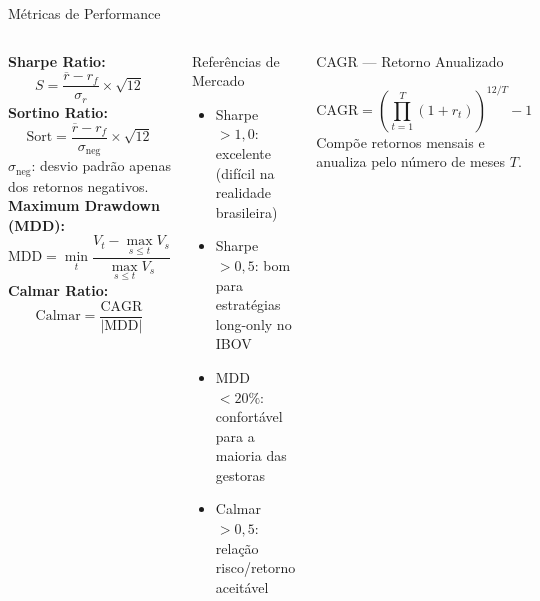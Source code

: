 \documentclass[aspectratio=169,12pt]{beamer}
\begin{document}
\begin{frame}[fragile]{Métricas de Performance}
\begin{columns}[T]
\textbf{Sharpe Ratio:}
\[ S = \frac{\overline{r} - r_f}{\sigma_r} \times \sqrt{12} \]
\vspace{.1em}
\textbf{Sortino Ratio:}
\[ \text{Sort} = \frac{\overline{r} - r_f}{\sigma_{\text{neg}}} \times \sqrt{12} \]
$\sigma_{\text{neg}}$: desvio padrão apenas dos retornos negativos.
\vspace{.2em}
\textbf{Maximum Drawdown (MDD):}
\[ \text{MDD} = \min_t \frac{V_t - \max_{s \leq t} V_s}{\max_{s \leq t} V_s} \]
\textbf{Calmar Ratio:}
\[ \text{Calmar} = \frac{\text{CAGR}}{|\text{MDD}|} \]
\begin{block}{Referências de Mercado}
\begin{itemize}
  \item Sharpe $> 1{,}0$: excelente (difícil na realidade brasileira)
  \item Sharpe $> 0{,}5$: bom para estratégias long-only no IBOV
  \item MDD $< 20\%$: confortável para a maioria das gestoras
  \item Calmar $> 0{,}5$: relação risco/retorno aceitável
\end{itemize}
\end{block}\vspace{.3em}
\begin{exampleblock}{CAGR — Retorno Anualizado}

\[ \text{CAGR} = \left(\prod_{t=1}^{T}(1+r_t)\right)^{12/T} - 1 \]
Compõe retornos mensais e anualiza pelo número de meses $T$.
\end{exampleblock}
\end{columns}
\end{frame}
\end{document}
